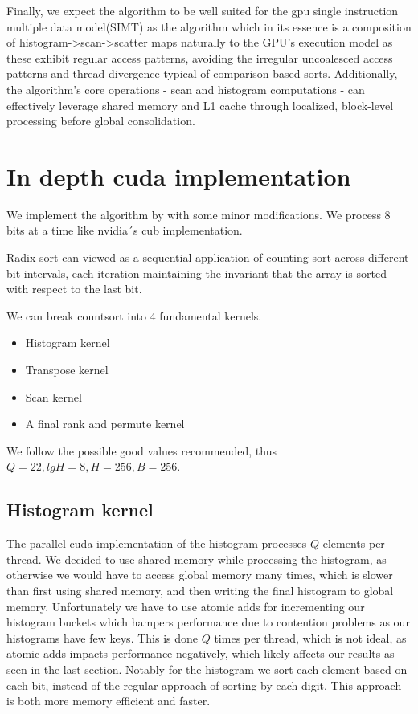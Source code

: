 \documentclass{article}
\begin{document}
Finally, we expect the algorithm to be well suited for the gpu single instruction multiple data model(SIMT) as the algorithm which in its essence is a composition of histogram->scan->scatter maps naturally to the GPU's execution model as these exhibit regular access patterns, avoiding the irregular uncoalesced  access patterns and thread divergence typical of comparison-based sorts. Additionally, the algorithm's core operations - scan and histogram computations - can effectively leverage shared memory and L1 cache through localized, block-level processing before global consolidation. 

\citep{ha2010implicit} 

\section{In depth cuda implementation}

We implement the algorithm by \citep{ha2010implicit} with some minor modifications. We process 8 bits at a time like nvidia´s cub implementation. 

Radix sort can viewed as a sequential application of counting sort across different bit intervals, each iteration maintaining the invariant that the array is sorted with respect to the last bit.

We can break countsort into 4 fundamental kernels.

\begin{itemize}
    \item Histogram kernel
    \item Transpose kernel
    \item Scan kernel
    \item A final rank and permute kernel
\end{itemize}

We follow the possible good values recommended, thus $Q = 22, lgH = 8, H = 256, B = 256$.

\subsection{Histogram kernel}
The parallel cuda-implementation of the histogram processes $Q$ elements per thread. 
We decided to use shared memory while processing the histogram, as otherwise we would have to access global memory many times, which is slower than first using shared memory, and then writing the final histogram to global memory.
Unfortunately we have to use atomic adds for incrementing our histogram buckets which hampers performance due to contention problems as our histograms have few keys. This is done $Q$ times per thread, which is not ideal, as atomic adds impacts performance negatively, which likely affects our results as seen in the last section.
Notably for the histogram we sort each element based on each bit, instead of the regular approach of sorting by each digit. This approach is both more memory efficient and faster.
\end{document}
